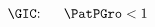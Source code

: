 \begin{equation}\begin{gathered}\begin{split}
    \text{\GIC:~~}  &&  \PatPGro  < 1 \phantom{/\PGro}&  \phantom{\text{\GIC:~~}} \label{eq:GICRaw}
\end{split}\end{gathered}\end{equation}
